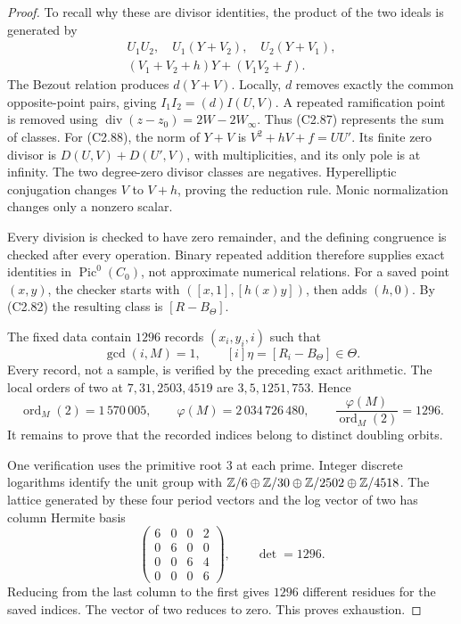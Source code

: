 \begin{proof}
To recall why these are divisor identities,
the product of the two ideals is generated by
\[
 \begin{gathered}
 U_1U_2,\quad U_1(Y+V_2),\quad U_2(Y+V_1),\\
 (V_1+V_2+h)Y+(V_1V_2+f).
 \end{gathered}
\]
The Bezout relation produces $d(Y+V)$.
Locally, $d$ removes exactly the common
opposite-point pairs, giving
$I_1I_2=(d)I(U,V)$. A repeated ramification
point is removed using
$\operatorname{div}(z-z_0)=2W-2W_\infty$.
Thus (C2.87) represents the sum of classes.
For (C2.88), the norm of $Y+V$ is
$V^2+hV+f=UU'$. Its finite zero divisor is
$D(U,V)+D(U',V)$, with multiplicities, and
its only pole is at infinity. The two
degree-zero divisor classes are negatives.
Hyperelliptic conjugation changes $V$ to
$V+h$, proving the reduction rule. Monic
normalization changes only a nonzero scalar.

Every division is checked to have zero
remainder, and the defining congruence is
checked after every operation. Binary
repeated addition therefore supplies exact
identities in $\operatorname{Pic}^0(C_0)$,
not approximate numerical relations.
For a saved point $(x,y)$, the checker starts
with $([x,1],[h(x)y])$, then adds $(h,0)$.
By (C2.82) the resulting class is
$[R-B_\Theta]$.

The fixed data contain $1296$ records
$(x_i,y_i,i)$ such that
\[
 \gcd(i,M)=1,
 \qquad [i]\eta=[R_i-B_\Theta]\in\Theta.                    \tag{C2.89}
\]
Every record, not a sample, is verified by
the preceding exact arithmetic. The local
orders of two at $7,31,2503,4519$ are
$3,5,1251,753$. Hence
\[
 \operatorname{ord}_M(2)=1\,570\,005,
 \qquad \varphi(M)=2\,034\,726\,480,
 \qquad \frac{\varphi(M)}{\operatorname{ord}_M(2)}=1296.     \tag{C2.90}
\]
It remains to prove that the recorded indices
belong to distinct doubling orbits.

One verification uses the primitive root
$3$ at each prime. Integer discrete logarithms
identify the unit group with
$\mathbb Z/6\oplus\mathbb Z/30\oplus\mathbb Z/2502\oplus\mathbb Z/4518$.
The lattice generated by these four period
vectors and the log vector of two has column
Hermite basis
\[
 \begin{pmatrix}
 6&0&0&2\\0&6&0&0\\0&0&6&4\\0&0&0&6
 \end{pmatrix},\qquad \det=1296.                            \tag{C2.91}
\]
Reducing from the last column to the first
gives $1296$ different residues for the
saved indices. The vector of two reduces
to zero. This proves exhaustion.


\end{proof}
